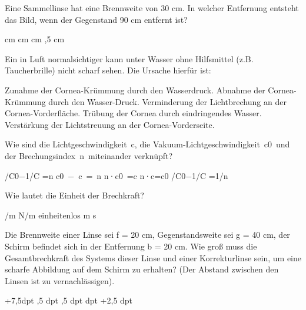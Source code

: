 \documentclass[11pt]{exam}
\begin{document}
\setlength{\voffset}{-0.5in}
\setlength{\headsep}{5pt}

\hspace{2mm}
 \hspace{5mm}
\vspace{4mm}

\begin{questions}

\question Eine Sammellinse hat eine Brennweite von 30 cm. In welcher Entfernung entsteht das Bild, wenn der Gegenstand 90 cm entfernt ist?

\begin{choices}
	 cm
	 cm
	 cm
	\choice 45cm
	,5 cm
\end{choices}

\vspace{3mm}\question Ein in Luft normalsichtiger kann unter Wasser ohne Hilfsmittel (z.B. Taucherbrille) nicht scharf sehen. Die Ursache hierfür ist:

\begin{choices}
	\choice Zunahme der Cornea-Krümmung durch den Wasserdruck.
	\choice Abnahme der Cornea-Krümmung durch den Wasser-Druck.
	\choice Verminderung der Lichtbrechung an der Cornea-Vorderfläche.
	\choice Trübung der Cornea durch eindringendes Wasser.
	\choice Verstärkung der Lichtstreuung an der Cornea-Vorderseite.
\end{choices}

\vspace{3mm}\question Wie sind die Lichtgeschwindigkeit c, die Vakuum-Lichtgeschwindigkeit c0 und der Brechungsindex n miteinander verknüpft?

\begin{choices}
	 /C0−1/C =n
	\choice c0 − c = n
	\choice n·c0 =c
	\choice n·c=c0
	 /C0−1/C =1/n
\end{choices}

\vspace{3mm}\question Wie lautet die Einheit der Brechkraft?

\begin{choices}
	/m
	\choice N/m
	\choice einheitenlos
	\choice m
	\choice s
\end{choices}

\vspace{3mm}\question Die Brennweite einer Linse sei f = 20 cm, Gegenstandsweite sei g = 40 cm, der Schirm befindet sich in der Entfernung b = 20 cm. Wie groß muss die Gesamtbrechkraft des Systems dieser Linse und einer Korrekturlinse sein, um eine scharfe Abbildung auf dem Schirm zu erhalten? (Der Abstand zwischen den Linsen ist zu vernachlässigen).

\begin{choices}
	\choice +7,5dpt
	,5 dpt
	,5 dpt
	 dpt
	\choice +2,5 dpt
\end{choices}

\vspace{3mm}\end{questions}
\end{document}
